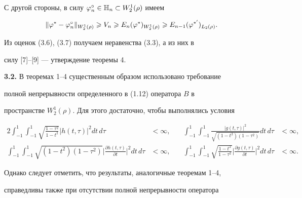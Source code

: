С другой стороны, в силу $\varphi_n^\circ\in \Bbb H_n\subset W_2^1(\rho)$ имеем 


\begin{equation}


\|\vp^*-\vp_n^\circ\|_{W_2^1(\rho)}\gea V_n\gea


E_n(\vp^*)_{W_2^1(\rho)}\gea E_{n-1}(\vp^{*'})_{L_2(\rho)}.


\end{equation}





Из оценок (3.6), (3.7) получаем неравенства (3.3), а из них в 


силу [7]--[9] --- утверждение теоремы 4.


\medskip





{\bf 3.2.} В теоремах 1--4 существенным образом использовано требование 


полной непрерывности определенного в (1.12) оператора $B$ в 


пространстве $W_2^1(\rho)$. Для этого достаточно, чтобы выполнялись условия 


\begin{alignat*}{2}


\int_{-1}^{1}\int_{-1}^1 \sqrt{\frac{1-\tau^2}{1-t^2}}|h(t,\tau)|^2


dt\,d\tau&<\infty,&\quad


\int_{-1}^{1}\int_{-1}^1\frac{|g(t,\tau)|^2}{\sqrt{(1-t^2)(1-\tau^2)}}


dt\,d\tau&<\infty, \\


%


\int_{-1}^{1}\int_{-1}^1\sqrt{(1-t^2)(1-\tau^2)}


\bigg|\frac{\partial h (t,\tau)}{\partial t}\bigg|^2 dt\,d\tau&<\infty,


&\quad


\int_{-1}^{1}\int_{-1}^1\sqrt{\frac{1-t^2}{1-\tau^2}}


\bigg|\frac{\partial g (t,\tau)}{\partial t}\bigg|^2dt\,d\tau &<\infty.


\end{alignat*}





Однако следует отметить, что результаты, аналогичные теоремам 1--4, 


справедливы также при отсутствии полной непрерывности оператора


